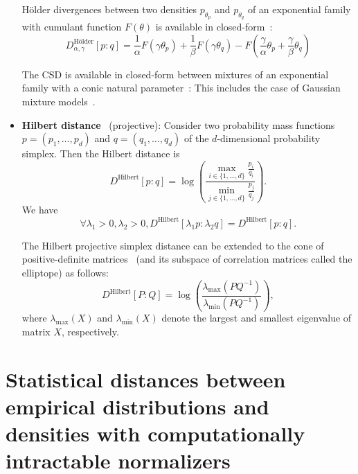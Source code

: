\documentclass[11pt]{article}
\begin{document}
\begin{itemize}
H\"older divergences between two densities $p_{\theta_p}$ and $p_{\theta_q}$ of an exponential family with cumulant function $F(\theta)$ is available in closed-form~\cite{HolderDivergence-2017}:
$$
D_{\alpha, \gamma}^{\mbox{H\"older}}[p:q]=\frac{1}{\alpha} F\left(\gamma \theta_{p}\right)+\frac{1}{\beta} F\left(\gamma \theta_{q}\right)-F\left(\frac{\gamma}{\alpha} \theta_{p}+\frac{\gamma}{\beta} \theta_{q}\right)
$$


The CSD is available in closed-form between mixtures of an exponential family with a conic natural parameter~\cite{nielsen2012closed}: This includes the case of Gaussian mixture models~\cite{kampa2011closed}.

\item {\bf Hilbert distance}~\cite{nielsen2019clustering} (projective): Consider two probability mass functions $p=(p_1,\ldots, p_d)$ and $q=(q_1,\ldots,q_d)$ of the $d$-dimensional probability simplex. Then the Hilbert distance is
$$
D^{\mathrm{Hilbert}}[p:q]=\log \left( \frac{\max _{i\in\{1,\ldots, d\}} \frac{p_{i}}{q_{i}}}{\min _{j\in\{1,\ldots, d\}} \frac{p_{j}}{q_{j}}}\right).
$$
We have 
$$
\forall \lambda_1>0, \lambda_2>0, D^{\mbox{Hilbert}}[\lambda_1 p:\lambda_2 q]= D^{\mbox{Hilbert}}[p:q].
$$

The Hilbert projective simplex distance can be extended to the cone of positive-definite matrices~\cite{nielsen2019clustering} (and its subspace of correlation matrices called the elliptope) as follows:
$$
D^{\mathrm{Hilbert}}[P:Q]=\log \left( \frac{\lambda_{\mathrm{max}}(PQ^{-1})}{\lambda_{\mathrm{\min}}(PQ^{-1})} \right),
$$
where $\lambda_{\mathrm{max}}(X)$ and $\lambda_{\mathrm{\min}}(X)$ denote the largest and smallest eigenvalue of matrix $X$, respectively.


\end{itemize}


\section{Statistical distances between empirical distributions and densities with computationally intractable normalizers}
\end{document}
